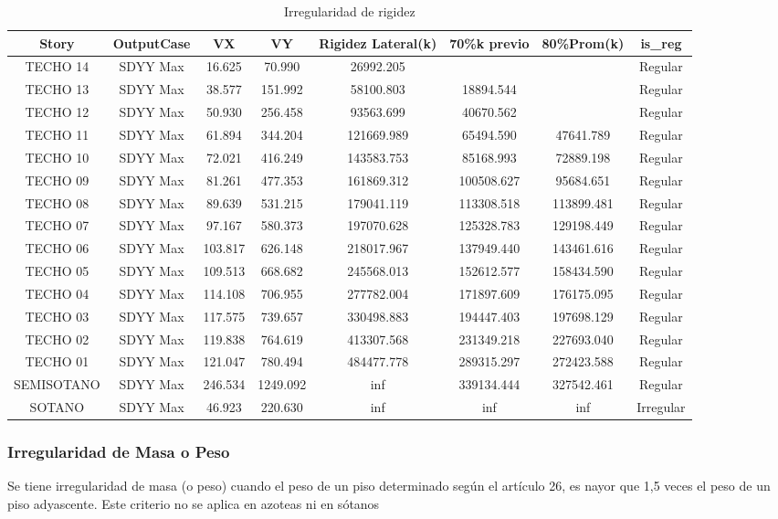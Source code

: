 \documentclass{article}%
\begin{document}
\begin{table}[h!]%
\centering%
\caption{Irregularidad de rigidez}%
\begin{tabular}{cccccccc}
\toprule
Story & OutputCase & VX & VY & Rigidez Lateral(k) & 70\%k previo & 80\%Prom(k) & is\_reg \\
\midrule
TECHO 14 & SDYY Max & 16.625 & 70.990 & 26992.205 &  &  & Regular \\
TECHO 13 & SDYY Max & 38.577 & 151.992 & 58100.803 & 18894.544 &  & Regular \\
TECHO 12 & SDYY Max & 50.930 & 256.458 & 93563.699 & 40670.562 &  & Regular \\
TECHO 11 & SDYY Max & 61.894 & 344.204 & 121669.989 & 65494.590 & 47641.789 & Regular \\
TECHO 10 & SDYY Max & 72.021 & 416.249 & 143583.753 & 85168.993 & 72889.198 & Regular \\
TECHO 09 & SDYY Max & 81.261 & 477.353 & 161869.312 & 100508.627 & 95684.651 & Regular \\
TECHO 08 & SDYY Max & 89.639 & 531.215 & 179041.119 & 113308.518 & 113899.481 & Regular \\
TECHO 07 & SDYY Max & 97.167 & 580.373 & 197070.628 & 125328.783 & 129198.449 & Regular \\
TECHO 06 & SDYY Max & 103.817 & 626.148 & 218017.967 & 137949.440 & 143461.616 & Regular \\
TECHO 05 & SDYY Max & 109.513 & 668.682 & 245568.013 & 152612.577 & 158434.590 & Regular \\
TECHO 04 & SDYY Max & 114.108 & 706.955 & 277782.004 & 171897.609 & 176175.095 & Regular \\
TECHO 03 & SDYY Max & 117.575 & 739.657 & 330498.883 & 194447.403 & 197698.129 & Regular \\
TECHO 02 & SDYY Max & 119.838 & 764.619 & 413307.568 & 231349.218 & 227693.040 & Regular \\
TECHO 01 & SDYY Max & 121.047 & 780.494 & 484477.778 & 289315.297 & 272423.588 & Regular \\
SEMISOTANO & SDYY Max & 246.534 & 1249.092 & inf & 339134.444 & 327542.461 & Regular \\
SOTANO & SDYY Max & 46.923 & 220.630 & inf & inf & inf & Irregular \\
\bottomrule
\end{tabular}
%
\end{table}

%
\subsubsection{Irregularidad de Masa o Peso}%
\label{ssubsec:IrregularidaddeMasaoPeso}%
\begin{tcolorbox}[colback=gray!5!white,colframe=cyan!75!black,fonttitle=\bfseries,title=Tabla N°9 E-030]%
Se tiene irregularidad de masa (o peso) cuando el peso de un piso determinado según el artículo 26, es nayor que 1,5 veces el peso de un piso adyascente. Este criterio no se aplica en azoteas ni en sótanos%
\end{tcolorbox}%
\end{document}

